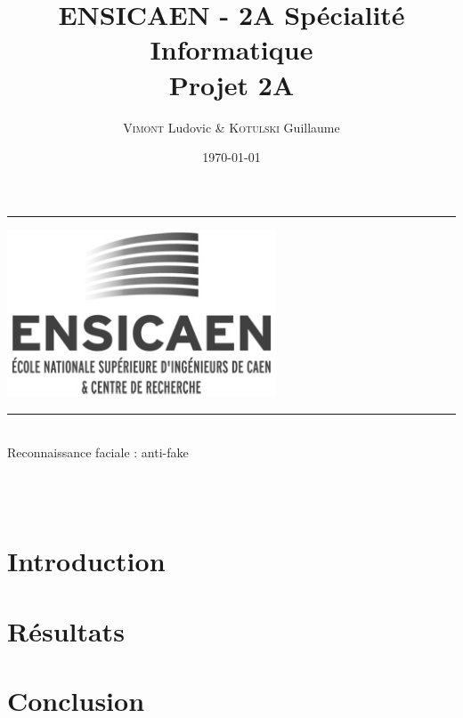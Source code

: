 \documentclass[a4paper]{report}
\title{ENSICAEN - 2A Spécialité Informatique\\Projet 2A}
\author{\textsc{Vimont} Ludovic \& \textsc{Kotulski} Guillaume}
\date{\today}
\newcommand{\HRule}{\rule{\linewidth}{0.5mm}}
\begin{document}
\begin{titlepage}
	\begin{center}
		\vspace*{\fill}
		\textsc{\Large \@title } 
		\HRule
		\vspace{1.5cm}
		\begin{center}
			\includegraphics[width=0.6\textwidth]{data/logo.png}
		\end{center}
		\vspace{1.5cm}
		\HRule \\
		\Large{Reconnaissance faciale : anti-fake}\\
		
		\large{\@author} \\
		\vspace*{\fill}

		 \\
		\@date
	\end{center}
\end{titlepage}

\chapter{Introduction}


\chapter{Résultats}


\chapter{Conclusion}

\end{document}

